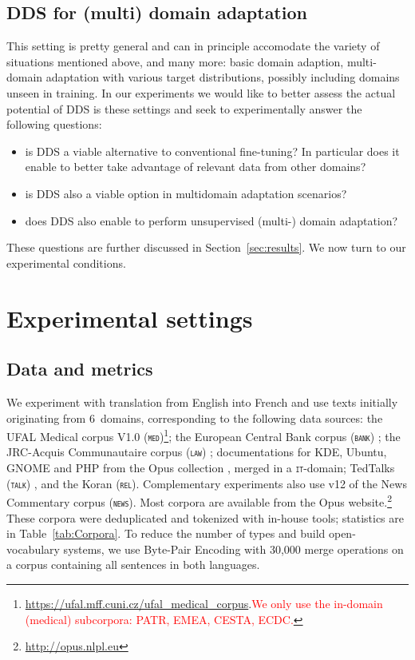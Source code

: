 \documentclass[11pt,a4paper]{article}
\newcommand{\fyTodo}[1]{\Todo[FY:]{\textcolor{orange}{#1}}}
\newcommand{\fyDone}[1]{\done[FY]\Todo[FY:]{\textcolor{orange}{#1}}}
\newcommand{\revision}[1]{\textcolor{red}{#1}}
\newcommand{\domain}[1]{\texttt{\textsc{#1}}}
\begin{document}
\subsection{DDS for (multi) domain adaptation}

This setting is pretty general and can in principle accomodate the variety of situations mentioned  above, and many more: basic domain adaption, multi-domain adaptation with various target distributions, possibly including domains unseen in training. In our experiments we would like to better assess the actual potential of DDS is these settings and seek to experimentally answer the following questions:
\begin{itemize}
\item is DDS a viable alternative to conventional fine-tuning? In particular does it enable to better take advantage of relevant data from other domains?
\item is DDS also a viable option in multidomain adaptation scenarios?
\item does DDS also enable to perform unsupervised (multi-) domain adaptation?\fyTodo{TBContinued}
\end{itemize}

These questions are further discussed in Section~\ref{sec:results}. We now turn to our experimental conditions.

\section{Experimental settings} \label{sec:exp}

\subsection{Data and metrics \label{ssec:corpora}}
We experiment with translation from English into French and use texts initially originating from 6~domains, corresponding to the following data sources: the UFAL Medical corpus V1.0 (\domain{med})\footnote{\url{https://ufal.mff.cuni.cz/ufal_medical_corpus}.\revision{We only use the in-domain (medical) subcorpora: PATR, EMEA, CESTA, ECDC.}}; the European Central Bank corpus (\domain{bank}) \cite{Tiedemann12parallel}; the JRC-Acquis Communautaire corpus (\domain{law}) \cite{Steinberger06acquis}; documentations for KDE, Ubuntu, GNOME and PHP from the Opus collection \cite{Tiedemann09news}, merged in a \domain{it}-domain; TedTalks (\domain{talk}) \cite{Cettolo12wit}, and the Koran (\domain{rel}). Complementary experiments also use v12 of the News Commentary corpus (\domain{news}). Most corpora are available from the Opus website.\footnote{\url{http://opus.nlpl.eu}} These corpora were deduplicated and tokenized with in-house tools; statistics are in Table~\ref{tab:Corpora}. To reduce the number of types and build open-vocabulary systems, we use Byte-Pair Encoding \cite{Sennrich16BPE} with 30,000 merge operations on a corpus containing all sentences in both languages.\fyDone{Add \# number of tokens, also specificity ?}%
\end{document}
